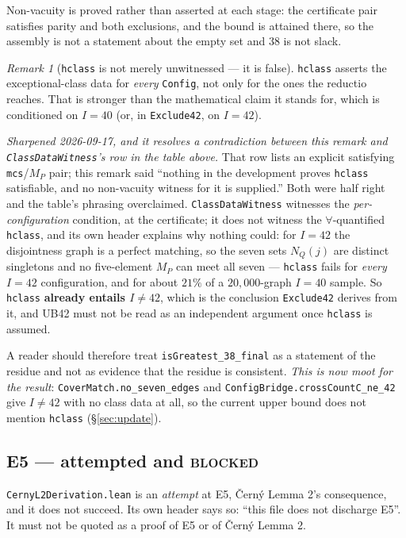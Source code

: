 \documentclass[11pt,a4paper]{article}
\theoremstyle{plain}
\theoremstyle{definition}
\theoremstyle{remark}
\newtheorem*{remark}{Remark}
\begin{document}
Non-vacuity is proved rather than asserted at each stage: the certificate pair
satisfies parity and both exclusions, and the bound is attained there, so the
assembly is not a statement about the empty set and $38$ is not slack.

\begin{remark}[\texttt{hclass} is not merely unwitnessed --- it is false]
\texttt{hclass} asserts the exceptional-class data for \emph{every}
\texttt{Config}, not only for the ones the reductio reaches. That is stronger
than the mathematical claim it stands for, which is conditioned on $I=40$ (or,
in \texttt{Exclude42}, on $I=42$).

\emph{Sharpened 2026-09-17, and it resolves a contradiction between this remark
and \texttt{ClassDataWitness}'s row in the table above.} That row lists an
explicit satisfying \texttt{mcs}/$M_P$ pair; this remark said ``nothing in the
development proves \texttt{hclass} satisfiable, and no non-vacuity witness for
it is supplied.'' Both were half right and the table's phrasing overclaimed.
\texttt{ClassDataWitness} witnesses the \emph{per-configuration} condition, at
the certificate; it does not witness the $\forall$-quantified \texttt{hclass},
and its own header explains why nothing could: for $I=42$ the disjointness graph
is a perfect matching, so the seven sets $N_Q(j)$ are distinct singletons and no
five-element $M_P$ can meet all seven --- \texttt{hclass} fails for
\emph{every} $I=42$ configuration, and for about $21\%$ of a $20{,}000$-graph
$I=40$ sample. So \texttt{hclass} \textbf{already entails $I\neq42$}, which is
the conclusion \texttt{Exclude42} derives from it, and \textsf{UB42} must not be
read as an independent argument once \texttt{hclass} is assumed.

A reader should therefore treat \texttt{isGreatest\_38\_final} as a statement of
the residue and not as evidence that the residue is consistent. \emph{This is
now moot for the result}: \texttt{CoverMatch.no\_seven\_edges} and
\texttt{ConfigBridge.crossCountC\_ne\_42} give $I\neq42$ with no class data at
all, so the current upper bound does not mention \texttt{hclass}
(\S\ref{sec:update}).
\end{remark}

\subsection*{\textsf{E5} --- attempted and \textsc{blocked}}\label{sec:e5}

\texttt{CernyL2Derivation.lean} is an \emph{attempt} at \textsf{E5},
{\v C}ern{\'y} Lemma 2's consequence, and it does not succeed. Its own header
says so: ``this file does not discharge E5''. It must not be quoted as a proof
of \textsf{E5} or of {\v C}ern{\'y} Lemma 2.
\end{document}
